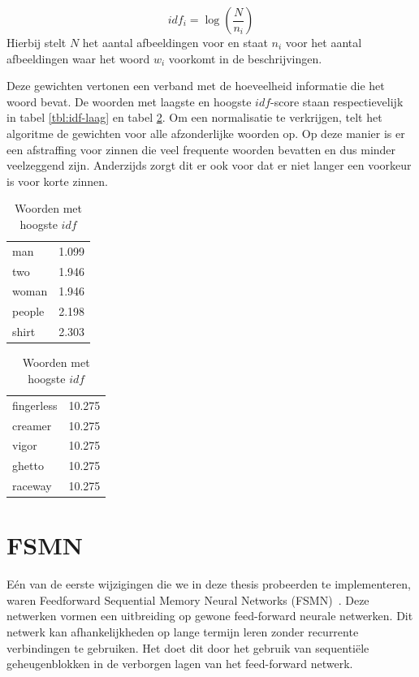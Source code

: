 \begin{equation}
    idf_i = \log(\frac{N}{n_i})
\end{equation}
Hierbij stelt $N$ het aantal afbeeldingen voor en staat $n_i$ voor het aantal afbeeldingen waar het woord $w_i$ voorkomt in de beschrijvingen.

Deze gewichten vertonen een verband met de hoeveelheid informatie die het woord bevat. De woorden met laagste en hoogste $idf$-score staan respectievelijk in tabel \ref{tbl:idf-laag} en tabel \ref{tbl:idf-hoog}. Om een normalisatie te verkrijgen, telt het algoritme de gewichten voor alle afzonderlijke woorden op. Op deze manier is er een afstraffing voor zinnen die veel frequente woorden bevatten en dus minder veelzeggend zijn. Anderzijds zorgt dit er ook voor dat er niet langer een voorkeur is voor korte zinnen.


\begin{table}[!htb]
	\begin{minipage}{.5\linewidth}
		\centering
		\begin{tabular}{ll}
    man    & 1.099 \\
    two    & 1.946 \\
    woman  & 1.946 \\
    people & 2.198 \\
    shirt  & 2.303 \\
		\end{tabular}
		\caption{Woorden met laagste $idf$}
		\label{tbl:idf-laag}
	\end{minipage}%
	\begin{minipage}{.5\linewidth}
		\centering
		
		\begin{tabular}{ll}
	fingerless & 10.275\\
	creamer& 10.275\\
	vigor& 10.275\\
	ghetto& 10.275\\
	raceway& 10.275\\
		\end{tabular}
		\caption{Woorden met hoogste $idf$}
		\label{tbl:idf-hoog}
	\end{minipage} 
\end{table}


\section{FSMN}
E\'en van de eerste wijzigingen die we in deze thesis probeerden te implementeren, waren Feedforward Sequential Memory Neural Networks (FSMN)~\cite{Zhang}. Deze netwerken vormen een uitbreiding op gewone feed-forward neurale netwerken. Dit netwerk kan afhankelijkheden op lange termijn leren zonder recurrente verbindingen te gebruiken. Het doet dit door het gebruik van sequenti\"ele geheugenblokken in de verborgen lagen van het feed-forward netwerk. 


